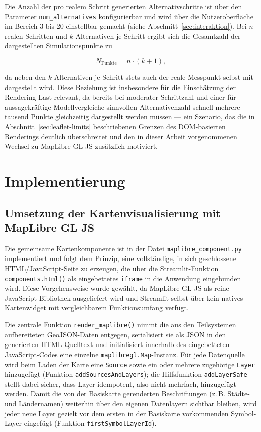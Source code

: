 \documentclass[12pt,a4paper]{report}
\begin{document}
Die Anzahl der pro realem Schritt generierten Alternativschritte ist über den Parameter \texttt{num\_alternatives} konfigurierbar und wird über die Nutzeroberfläche im Bereich 3 bis 20 einstellbar gemacht (siehe Abschnitt~\ref{sec:interaktion}). Bei $n$ realen Schritten und $k$ Alternativen je Schritt ergibt sich die Gesamtzahl der dargestellten Simulationspunkte zu

\begin{equation}
N_{\text{Punkte}} = n \cdot (k + 1),
\label{eq:punktanzahl}
\end{equation}

da neben den $k$ Alternativen je Schritt stets auch der reale Messpunkt selbst mit dargestellt wird. Diese Beziehung ist insbesondere für die Einschätzung der Rendering-Last relevant, da bereits bei moderater Schrittzahl und einer für aussagekräftige Modellvergleiche sinnvollen Alternativenzahl schnell mehrere tausend Punkte gleichzeitig dargestellt werden müssen — ein Szenario, das die in Abschnitt~\ref{sec:leaflet-limits} beschriebenen Grenzen des DOM-basierten Renderings deutlich überschreitet und den in dieser Arbeit vorgenommenen Wechsel zu MapLibre GL JS zusätzlich motiviert.

\chapter{Implementierung}

\section{Umsetzung der Kartenvisualisierung mit MapLibre GL JS}

Die gemeinsame Kartenkomponente ist in der Datei \texttt{maplibre\_component.py} implementiert und folgt dem Prinzip, eine vollständige, in sich geschlossene HTML/JavaScript-Seite zu erzeugen, die über die Streamlit-Funktion \texttt{components.html()} als eingebettetes \texttt{iframe} in die Anwendung eingebunden wird. Diese Vorgehensweise wurde gewählt, da MapLibre GL JS als reine JavaScript-Bibliothek ausgeliefert wird und Streamlit selbst über kein natives Kartenwidget mit vergleichbarem Funktionsumfang verfügt.

Die zentrale Funktion \texttt{render\_maplibre()} nimmt die aus den Teilsystemen aufbereiteten GeoJSON-Daten entgegen, serialisiert sie als JSON in den generierten HTML-Quelltext und initialisiert innerhalb des eingebetteten JavaScript-Codes eine einzelne \texttt{maplibregl.Map}-Instanz. Für jede Datenquelle wird beim Laden der Karte eine \texttt{Source} sowie ein oder mehrere zugehörige \texttt{Layer} hinzugefügt (Funktion \texttt{addSourcesAndLayers}); die Hilfsfunktion \texttt{addLayerSafe} stellt dabei sicher, dass Layer idempotent, also nicht mehrfach, hinzugefügt werden. Damit die von der Basiskarte gerenderten Beschriftungen (z.\,B. Städte- und Ländernamen) weiterhin über den eigenen Datenlayern sichtbar bleiben, wird jeder neue Layer gezielt vor dem ersten in der Basiskarte vorkommenden Symbol-Layer eingefügt (Funktion \texttt{firstSymbolLayerId}).
\end{document}

